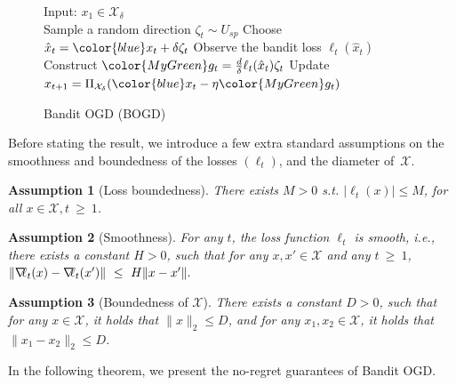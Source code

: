 \documentclass[a4paper,11pt,fullpage]{article}
\def\X{{\mathcal X}}
\theoremstyle{plain}
\newtheorem{assumption}{Assumption}
\theoremstyle{definition}
\theoremstyle{plain}
\renewcommand{\leq}{~\le~}
\renewcommand{\geq}{~\ge~}
\let\nablaold\nabla
\renewcommand{\nabla}{\nablaold\mkern-2.5mu}
\begin{document}
\begin{figure}
\vspace{-2\baselineskip}
\begin{minipage}{\linewidth}
\begin{algorithm}[H]
\caption{Bandit OGD (BOGD) \citep{flaxman-kalai-mcmahan05}} \label{alg4}
\begin{algorithmic}[1]
\STATE Input: $x_1 \in \X_\delta$\\
\STATE Sample a random direction $\zeta_t \sim U_{sp}$
\STATE Choose $\hat{x}_t = {\color{blue} x_t} + \delta \zeta_t$
\STATE Observe the bandit loss $\ell_t(\hat{x}_t)$
\STATE Construct ${\color{MyGreen} g_t} = \frac{d}{\delta} \ell_t(\hat{x}_t) \zeta_t$
\STATE 
Update 
$x_{t+1} = \Pi_{\X_{\delta}} ({\color{blue} x_t}-\eta {\color{MyGreen} g_t})$
\ENDFOR
\end{algorithmic}
\end{algorithm}
\end{minipage}
\vspace{-3\baselineskip} 
\end{figure}

\noindent Before stating the result, we introduce a few extra standard assumptions on the smoothness and boundedness of the losses $(\ell_t)$, and the diameter of~$\X$. 

\begin{assumption}[Loss boundedness]
There exists $M>0$ s.t. $|\ell_t(x)| \le M$, for all $x \in \X, t \geq 1$. 
\end{assumption}
\begin{assumption}[Smoothness]
\label{as:smoothness-bandit}
    For any $t$, the loss function $\ell_t$ is smooth, i.e., 
    there exists a constant $H>0$, such that for any $x,x' \in \X$ and any $t \geq 1$, 
    $\|\nabla \ell_t(x) - \nabla \ell_t(x')\| \leq H \|x - x'\|.$
\end{assumption}

\begin{assumption}[Boundedness of $\X$]
\label{as:bounded-euclidean-diam}
    There exists a constant $D>0$, such that for  any $x \in \X$, it holds that $\|x \|_{2} \le D$, and for any $x_1,x_2 \in \X$, it holds that $\|x_1-x_2 \|_{2} \le D$.
\end{assumption}

In the following theorem, we present the no-regret guarantees of Bandit OGD.
\end{document}
